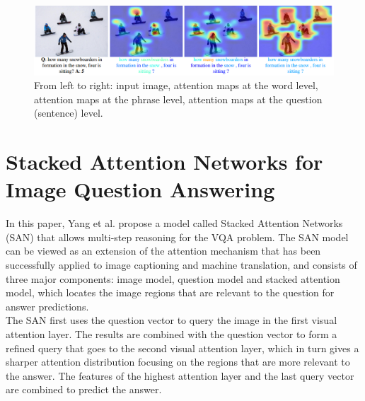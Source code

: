 \documentclass{article}
\begin{document}
    \begin{figure}[ht]
    	\centering
            \includegraphics[width=1.0\linewidth]{coattMaps.PNG}
    	\caption{From left to right: input image, attention maps at the word level, attention maps at the phrase level, attention maps at the question (sentence) level.}
    	\label{coattMaps}
    \end{figure}
    
\section{Stacked Attention Networks for Image Question Answering}
In this paper, Yang et al. \citep{corrYang15} propose a model called Stacked Attention Networks (SAN) that allows multi-step reasoning for the VQA problem. The SAN model can be viewed as an extension of the attention mechanism that has been successfully applied to image captioning and machine translation, and consists of three major components: image model, question model and stacked attention model, which locates the image regions that are relevant to the question for answer predictions.\\
The SAN first uses the question vector to query the image in the first visual attention layer. The results are combined with the question vector to form a refined query that goes to the second visual attention layer, which in turn gives a sharper attention distribution focusing on the regions that are more relevant to the answer. The features of the highest attention layer and the last query vector are combined to predict the answer.
\end{document}
